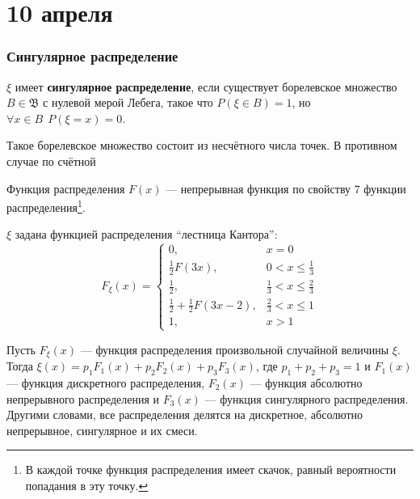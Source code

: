 \chapter{10 апреля}

\subsection{Сингулярное распределение}


\begin{definition}
    \(\xi\) имеет \textbf{сингулярное распределение}, если существует борелевское множество \(B \in \mathfrak{B}\) с нулевой мерой Лебега, такое что \(P(\xi \in B) = 1\), но \(\forall x \in B \ \ P(\xi = x) = 0\).
\end{definition}

\begin{remark}
    Такое борелевское множество состоит из несчётного числа точек. В противном случае по счётной
\end{remark}

\begin{remark}
    Функция распределения \(F(x)\) --- непрерывная функция по свойству 7 функции распределения\footnote{В каждой точке функция распределения имеет скачок, равный вероятности попадания в эту точку.}.
\end{remark}

\begin{example}
    \(\xi\) задана функцией распределения ``лестница Кантора'':
    \[F_\xi(x) = \begin{cases}
            0,                                   & x = 0                            \\
            \frac{1}{2} F(3x),                   & 0 < x \leq \frac{1}{3}           \\
            \frac{1}{2},                         & \frac{1}{3} < x \leq \frac{2}{3} \\
            \frac{1}{2} + \frac{1}{2} F(3x - 2), & \frac{2}{3} < x \leq 1           \\
            1,                                   & x > 1
        \end{cases} \]
\end{example}

\begin{theorem}[Лебега]
    Пусть \(F_\xi(x)\) --- функция распределения произвольной случайной величины \(\xi\). Тогда \(\xi(x) = p_1 F_1(x) + p_2 F_2(x) + p_3 F_3(x)\), где \(p_1 + p_2 + p_3 = 1\) и \(F_1(x)\) --- функция дискретного распределения, \(F_2(x)\) --- функция абсолютно непрерывного распределения и \(F_3(x)\) --- функция сингулярного распределения. Другими словами, все распределения делятся на дискретное, абсолютно непрерывное, сингулярное и их смеси.
\end{theorem}

